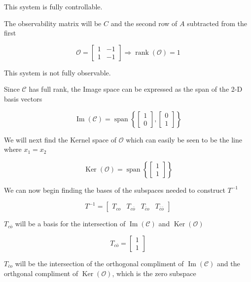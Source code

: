 \documentclass{article}
\begin{document}
This system is fully controllable.

The observability matrix will be $C$ and the second row of $A$ subtracted from the first

\[
    \mathcal{O} = 
    \begin{bmatrix}
        1 & -1 \\
        1 & -1    
    \end{bmatrix}
    \Rightarrow \operatorname{rank}(\mathcal{O}) = 1
\]

This system is not fully observable.

Since $\mathcal{C}$ has full rank, the Image space can be expressed as the span of the 2-D basis vectors

\[
\operatorname{Im}(\mathcal{C}) = \operatorname{span}
    \left\{
    \begin{bmatrix}
        1 \\
        0
    \end{bmatrix},
    \begin{bmatrix}
        0 \\
        1
    \end{bmatrix}
    \right\}
\]

We will next find the Kernel space of $\mathcal{O}$ which can easily be seen to be the line where $x_1 = x_2$

\[
    \operatorname{Ker}(\mathcal{O}) = \operatorname{span}
    \left\{
        \begin{bmatrix}
            1 \\
            1
        \end{bmatrix}
    \right\}
\]

We can now begin finding the bases of the subspaces needed to construct $T^{-1}$

\[
T^{-1} = 
\begin{bmatrix}
    T_{c o} & T_{c \bar o} & T_{\bar c o} & T_{\bar c \bar o}
\end{bmatrix}
\]

$T_{c \bar o}$ will be a basis for the intersection of $\operatorname{Im}(\mathcal{C})$ and $\operatorname{Ker}(\mathcal{O})$

\[
T_{c \bar o} = 
\begin{bmatrix}
    1 \\
    1
\end{bmatrix}
\]

$T_{\bar c o}$ will be the intersection of the orthogonal compliment of $\operatorname{Im}(\mathcal{C})$ and the orthgonal compliment of $\operatorname{Ker}(\mathcal{O})$, which is the zero subspace
\end{document}
